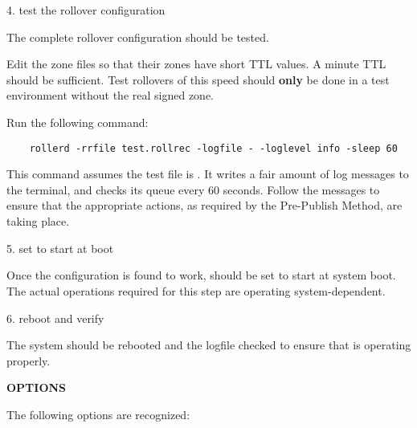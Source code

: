 \begin{description}
\item 4. test the rollover configuration\verb" "

The complete rollover configuration should be tested.  

Edit the zone files so that their zones have short TTL values.  A minute TTL
should be sufficient.  Test rollovers of this speed should {\bf only} be done
in a test environment without the real signed zone.

Run the following command:

\begin{verbatim}
    rollerd -rrfile test.rollrec -logfile - -loglevel info -sleep 60
\end{verbatim}

This command assumes the test  file is .
It writes a fair amount of log messages to the terminal, and checks its queue
every 60 seconds.  Follow the messages to ensure that the appropriate actions,
as required by the Pre-Publish Method, are taking place.

\item 5. set  to start at boot\verb" "

Once the configuration is found to work,  should be set to start
at system boot.  The actual operations required for this step are operating
system-dependent.

\item 6. reboot and verify\verb" "

The system should be rebooted and the  logfile checked to ensure
that  is operating properly.

\end{description}

{\bf OPTIONS}

The following options are recognized:

